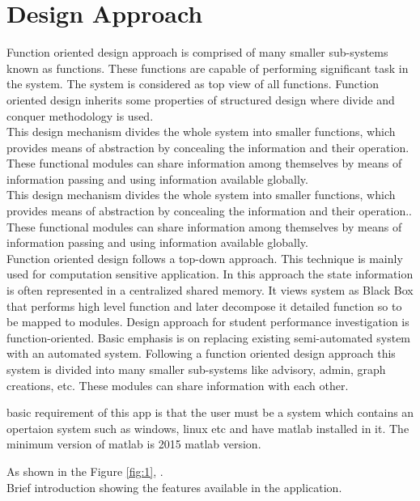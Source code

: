 
\section{Design Approach}

Function oriented design approach is comprised of many smaller sub-systems known as functions. These functions are capable of performing significant task in the system. The system is considered as top view of all functions.
Function oriented design inherits some properties of structured design where divide and conquer methodology is used.\\

This design mechanism divides the whole system into smaller functions, which provides means of abstraction by concealing the information and their operation. These functional modules can share information among themselves by means of information passing and using information available globally.\\

This design mechanism divides the whole system into smaller functions, which provides means of abstraction by concealing the information and their operation.. These functional modules can share information among themselves by means of information passing and using information available globally.\\

Function oriented design follows a top-down approach. This technique is mainly used for computation sensitive application. In this approach the state information is often represented in a centralized shared memory. It views system as Black Box that performs high level function and later decompose it detailed function so to be mapped to modules.
Design approach for student performance investigation is function-oriented. Basic emphasis is on replacing existing semi-automated system with an automated system. Following a function oriented design approach this system is divided into many smaller sub-systems like advisory, admin, graph creations, etc. These modules can share information with each other. 


\iffalse
 basic requirement of this app is that the user must be a system which contains an opertaion system such as windows, linux etc and have matlab installed in it. The minimum version of matlab is 2015 matlab version.


\noindent As shown in the Figure \ref{fig:1}, .\\Brief introduction showing the features available in the application.

